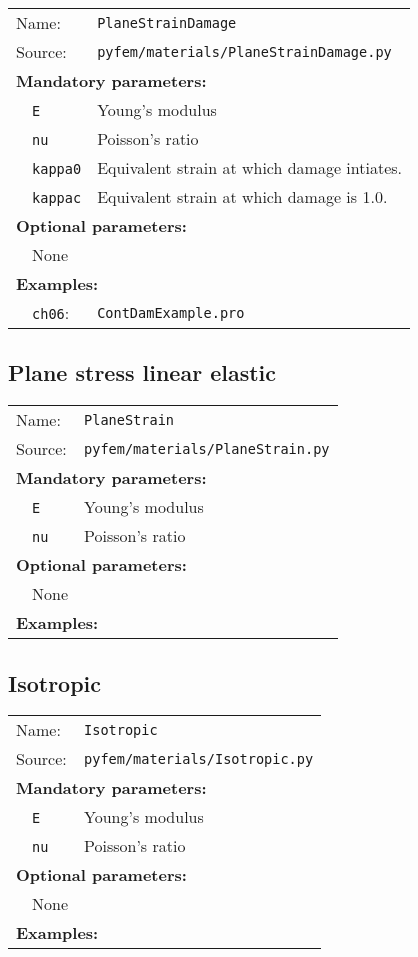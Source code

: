 \documentclass{article}
\begin{document}
\begin{tabular}{p{22mm}p{74mm}}
Name:         & \texttt{PlaneStrainDamage} \\
Source:  & \texttt{pyfem/materials/PlaneStrainDamage.py} \\
\multicolumn{2}{l}{\textbf{Mandatory parameters:}} \\
~~\texttt{E} & Young's modulus \\
~~\texttt{nu} & Poisson's ratio \\
~~\texttt{kappa0} & Equivalent strain at which damage intiates.\\
~~\texttt{kappac} & Equivalent strain at which damage is 1.0.\\
\multicolumn{2}{l}{\textbf{Optional parameters:}} \\
~~None  & \\
\multicolumn{2}{l}{\textbf{Examples:}}\\
~~\texttt{ch06}: & \texttt{ContDamExample.pro}
\end{tabular}

\subsection{Plane stress linear elastic}

\begin{tabular}{p{22mm}p{74mm}}
Name:         & \texttt{PlaneStrain} \\
Source:  & \texttt{pyfem/materials/PlaneStrain.py} \\
\multicolumn{2}{l}{\textbf{Mandatory parameters:}} \\
~~\texttt{E} & Young's modulus \\
~~\texttt{nu} & Poisson's ratio \\
\multicolumn{2}{l}{\textbf{Optional parameters:}} \\ 
~~None  & \\
\multicolumn{2}{l}{\textbf{Examples:}}
\end{tabular}

\subsection{Isotropic}

\begin{tabular}{p{22mm}p{74mm}}
Name:         & \texttt{Isotropic} \\
Source:  & \texttt{pyfem/materials/Isotropic.py} \\
\multicolumn{2}{l}{\textbf{Mandatory parameters:}} \\
~~\texttt{E} & Young's modulus \\
~~\texttt{nu} & Poisson's ratio \\
\multicolumn{2}{l}{\textbf{Optional parameters:}} \\ 
~~None  & \\
\multicolumn{2}{l}{\textbf{Examples:}}
\end{tabular}
\end{document}
